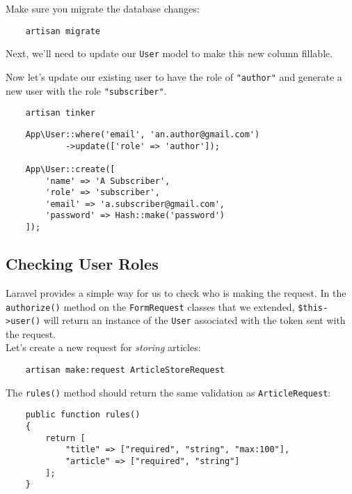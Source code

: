 Make sure you migrate the database changes:

\begin{verbatim}
    artisan migrate
\end{verbatim}

Next, we'll need to update our \texttt{User} model to make this new column fillable.


Now let's update our existing user to have the role of \texttt{"author"} and generate a new user with the role \texttt{"subscriber"}.

\begin{verbatim}
    artisan tinker
\end{verbatim}

\begin{verbatim}
    App\User::where('email', 'an.author@gmail.com')
            ->update(['role' => 'author']);

    App\User::create([
        'name' => 'A Subscriber',
        'role' => 'subscriber',
        'email' => 'a.subscriber@gmail.com',
        'password' => Hash::make('password')
    ]);
\end{verbatim}


\subsection{Checking User Roles}

Laravel provides a simple way for us to check who is making the request. In the \texttt{authorize()} method on the \texttt{FormRequest} classes that we extended, \texttt{\$this->user()} will return an instance of the \texttt{User} associated with the token sent with the request.
\\

Let's create a new request for \textit{storing} articles:

\begin{verbatim}
    artisan make:request ArticleStoreRequest
\end{verbatim}

The \texttt{rules()} method should return the same validation as \texttt{ArticleRequest}:

\begin{verbatim}
    public function rules()
    {
        return [
            "title" => ["required", "string", "max:100"],
            "article" => ["required", "string"]
        ];
    }
\end{verbatim}

